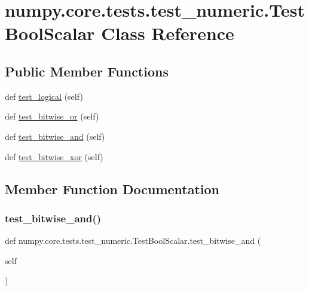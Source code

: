 \hypertarget{classnumpy_1_1core_1_1tests_1_1test__numeric_1_1TestBoolScalar}{}\section{numpy.\+core.\+tests.\+test\+\_\+numeric.\+Test\+Bool\+Scalar Class Reference}
\label{classnumpy_1_1core_1_1tests_1_1test__numeric_1_1TestBoolScalar}
\subsection*{Public Member Functions}
\begin{DoxyCompactItemize}
\item 
def \hyperlink{classnumpy_1_1core_1_1tests_1_1test__numeric_1_1TestBoolScalar_a1dd66f610bf3e670b1c6a59e76902dd6}{test\+\_\+logical} (self)
\item 
def \hyperlink{classnumpy_1_1core_1_1tests_1_1test__numeric_1_1TestBoolScalar_afb819d8c2025812c73a3e53bc342fcf3}{test\+\_\+bitwise\+\_\+or} (self)
\item 
def \hyperlink{classnumpy_1_1core_1_1tests_1_1test__numeric_1_1TestBoolScalar_a72b49545d43d58d190da29690f70f9e5}{test\+\_\+bitwise\+\_\+and} (self)
\item 
def \hyperlink{classnumpy_1_1core_1_1tests_1_1test__numeric_1_1TestBoolScalar_a7ba997262d191d7313e06f207329b03c}{test\+\_\+bitwise\+\_\+xor} (self)
\end{DoxyCompactItemize}


\subsection{Member Function Documentation}
\mbox{\label{classnumpy_1_1core_1_1tests_1_1test__numeric_1_1TestBoolScalar_a72b49545d43d58d190da29690f70f9e5}} 
\subsubsection{\texorpdfstring{test\+\_\+bitwise\+\_\+and()}{test\_bitwise\_and()}}
{\footnotesize\ttfamily def numpy.\+core.\+tests.\+test\+\_\+numeric.\+Test\+Bool\+Scalar.\+test\+\_\+bitwise\+\_\+and (\begin{DoxyParamCaption}\item[{}]{self }\end{DoxyParamCaption})}

